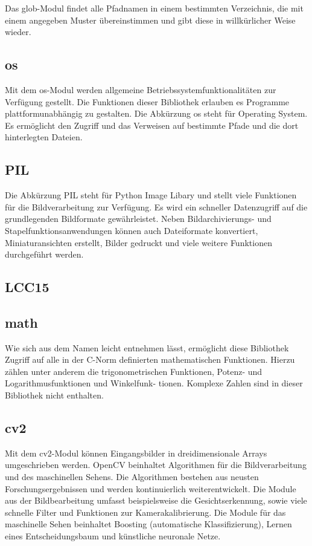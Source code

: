 Das glob-Modul findet alle Pfadnamen in einem bestimmten Verzeichnis, die mit einem
angegeben Muster übereinstimmen und gibt diese in willkürlicher Weise wieder. \cite{Python:2020}

\subsection{os}

Mit dem os-Modul werden allgemeine Betriebssystemfunktionalitäten zur Verfügung gestellt. 
Die Funktionen dieser Bibliothek erlauben es Programme plattformunabhängig zu
gestalten. Die Abkürzung os steht für Operating System. Es ermöglicht den Zugriff und
das Verweisen auf bestimmte Pfade und die dort hinterlegten Dateien. \cite{Balakreshnan:2019}

\subsection{PIL}

Die Abkürzung PIL steht für Python Image Libary und stellt viele Funktionen für die
Bildverarbeitung zur Verfügung. Es wird ein schneller Datenzugriff auf die grundlegenden
Bildformate gewährleistet. Neben Bildarchivierungs- und Stapelfunktionsanwendungen
können auch Dateiformate konvertiert, Miniaturansichten erstellt, Bilder gedruckt und
viele weitere Funktionen durchgeführt werden. \subsection{LCC15}

\subsection{math}

Wie sich aus dem Namen leicht entnehmen lässt, ermöglicht diese Bibliothek Zugriff auf
alle in der C-Norm definierten mathematischen Funktionen. Hierzu zählen unter anderem
die trigonometrischen Funktionen, Potenz- und Logarithmusfunktionen und Winkelfunk-
tionen. Komplexe Zahlen sind in dieser Bibliothek nicht enthalten. \cite{Python:2020c}


\subsection{cv2}

Mit dem cv2-Modul können Eingangsbilder in dreidimensionale Arrays umgeschrieben
werden. OpenCV beinhaltet Algorithmen für die Bildverarbeitung und des maschinellen
Sehens. Die Algorithmen bestehen aus neusten Forschungsergebnissen und werden kontinuierlich 
weiterentwickelt. Die Module aus der Bildbearbeitung umfasst beispielsweise die
Gesichtserkennung, sowie viele schnelle Filter und Funktionen zur Kamerakalibrierung.
Die Module für das maschinelle Sehen beinhaltet Boosting (automatische Klassifizierung),
Lernen eines Entscheidungsbaum und künstliche neuronale Netze. \cite{OpenCV:2020}

